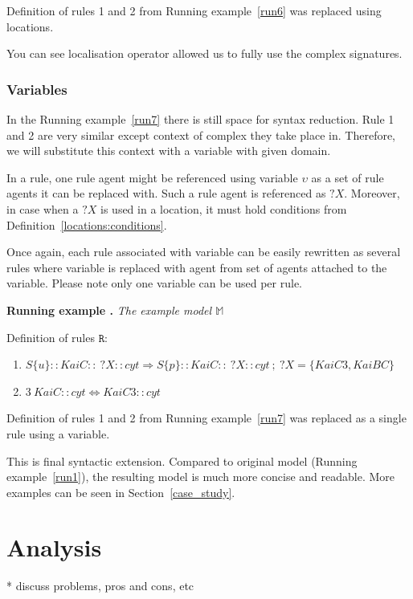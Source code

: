 \documentclass[12pt]{fithesis2}
\newcounter{counter}[section]
\renewcommand{\thecounter}{\thesection.\arabic{counter}}
\newenvironment{runningExample}[1]{\bigskip\refstepcounter{counter}\noindent\textbf{Running example \thecounter} \textit{#1} \par\nopagebreak}{\bigskip}
\begin{document}
\noindent Definition of rules 1 and 2 from Running example~\ref{run6} was replaced using locations.

You can see localisation operator allowed us to fully use the complex signatures.

\subsection{Variables}

In the Running example~\ref{run7} there is still space for syntax reduction. Rule 1 and 2 are very similar except context of complex they take place in. Therefore, we will substitute this context with a variable with given domain.

In a rule, one rule agent might be referenced using variable $\upsilon$ as a set of rule agents it can be replaced with. Such a rule agent is referenced as $?X$. Moreover, in case when a $?X$ is used in a location, it must hold conditions from Definition~\ref{locations:conditions}.

Once again, each rule associated with variable can be easily rewritten as several rules where variable is replaced with agent from set of agents attached to the variable. Please note only one variable can be used per rule.

\begin{runningExample}{The example model $\mathds{M}$}
\label{run8}
\noindent Definition of rules $\mathtt{R}$:
{\small
\begin{enumerate}
\item $S\{u\}::KaiC::~?X::cyt \Rightarrow S\{p\}::KaiC::~?X::cyt ~;~ ?X = \{KaiC3, KaiBC\}$
\item $3~KaiC::cyt \Leftrightarrow KaiC3::cyt$
\end{enumerate}
}
\end{runningExample}

\noindent Definition of rules 1 and 2 from Running example~\ref{run7} was replaced as a single rule using a variable.

This is final syntactic extension. Compared to original model (Running example~\ref{run1}), the resulting model is much more concise and readable. More examples can be seen in Section~\ref{case_study}.

\chapter{Analysis}

* discuss problems, pros and cons, etc
\end{document}
